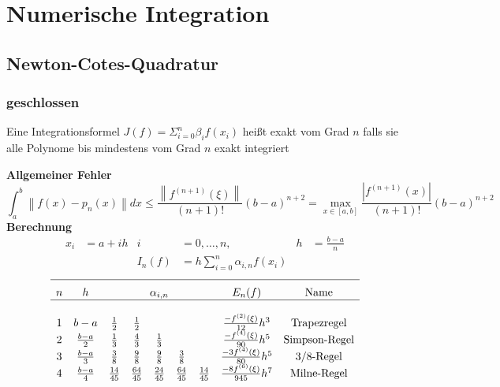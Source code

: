 \documentclass[
	ngerman,
	accentcolor=9c,%
	type=intern,
	marginpar=false
	]{tudapub}
\begin{document}
\section{Numerische Integration}
    \subsection{Newton-Cotes-Quadratur}
        \subsubsection{geschlossen}
            \begin{definition}
                Eine Integrationsformel $J(f) = \Sigma_{i=0}^n \beta_i f(x_i)$ heißt exakt vom Grad $n$
                falls sie alle Polynome bis mindestens vom Grad $n$ exakt integriert 
            \end{definition}
            \textbf{Allgemeiner Fehler}
            \begin{equation*}
                \int_a^b \left\| f(x)  - p_n(x) \right\| dx \leq \dfrac{\left\| f^{(n+1)}(\xi)\right\|}{(n+1)!}(b-a)^{n+2}
                = \max_{x \in [a,b] } \dfrac{ | f^{(n+1)}(x)| }{(n+1)!}(b-a)^{n+2}
            \end{equation*}
            \textbf{Berechnung}
            \begin{align*}
                x_i &= a+ih &  i&=0,\dots,n, &  h&=\frac{b-a}{n} \\
                & & I_n(f) &= h \sum^n_{i=0} \alpha_{i,n} f(x_i)
            \end{align*}
            \begin{equation*}
                \begin{array}{c c c c c c c c c}
                    \hline\\[-.5\normalbaselineskip]
                    n & h & \multicolumn{5}{c}{\alpha_{i,n}}& E_n (f) & \text{Name}\\
                    \hline\\
                    1 & b-a & \frac{1}{2} & \frac{1}{2} & & & & \frac{-f^{(2)}(\xi)}{12}h^3 & \text{Trapezregel}\\
                    2 & \frac{b-a}{2} & \frac{1}{3} & \frac{4}{3} & \frac{1}{3} & & & \frac{-f^{(4)}(\xi)}{90}h^5 & \text{Simpson-Regel}\\
                    3 & \frac{b-a}{3} & \frac{3}{8} & \frac{9}{8} & \frac{9}{8} & \frac{3}{8} & & \frac{-3f^{(4)}(\xi)}{80}h^5 & \text{3/8-Regel}\\
                    4 & \frac{b-a}{4} & \frac{14}{45} & \frac{64}{45} & \frac{24}{45} & \frac{64}{45} & \frac{14}{45} & \frac{-8f^{(6)}(\xi)}{945}h^7 & \text{Milne-Regel}\\
                \end{array}
            \end{equation*}
\end{document}
